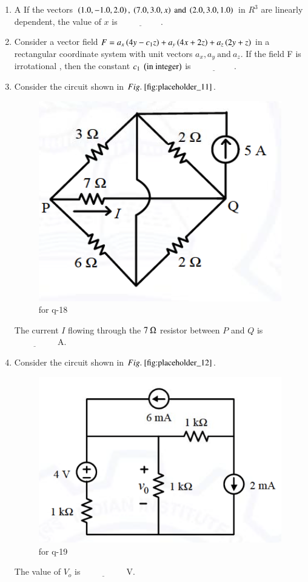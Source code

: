 \documentclass[journal,12pt,onecolumn]{IEEEtran}
\theoremstyle{remark}
\begin{document}
\begin{enumerate}
\item A If the vectors $\left(1.0, -1.0, 2.0\right), \ \left(7.0,3.0, x\right) \ \text{and} \ \left(2.0,3.0,1.0\right)$ in $R^3$ are linearly dependent, the value of $x$ is $\underline{\hspace{2cm}}$. 

\hfill {}

\item Consider a vector field $F=a_x \left(4y-c_1z\right) + a_y\left(4x + 2z\right) + a_z\left(2y+z\right)$ in a rectangular coordinate system  with unit vectors $a_x,a_y \ \text{and}\  a_z$. If the field F is irrotational , then the constant $c_1 \ \left(\text{in integer}\right)$ is $\underline{\hspace{2cm}}$. 

\hfill {}



\item Consider the circuit shown in $\figref{fig:placeholder_11}$.  
\begin{figure}[H]
    \centering
    \includegraphics[width=0.3\columnwidth]{figs/11.png}
    \caption{\centering for q-18}
    \label{fig:placeholder_11}
\end{figure}
The current $I$ flowing through the $7\ \ohm$ resistor between $P$ and $Q$  is $\underline{\hspace{2cm}}$  A.  

\hfill {}

\item Consider the circuit  shown in $\figref{fig:placeholder_12}$.  
\begin{figure}[H]
    \centering
    \includegraphics[width=0.4\columnwidth]{figs/12.png}
    \caption{\centering for q-19}
    \label{fig:placeholder_12}
\end{figure}
The value of $V_o$  is $\underline{\hspace{2cm}}$ V.  


\end{enumerate}
\end{document}
